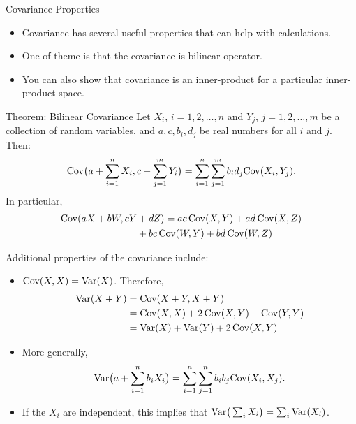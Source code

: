 \begin{frame}[allowframebreaks]{Covariance Properties}
  \begin{itemize}
    \item Covariance has several useful properties that can help with calculations.
    \item One of theme is that the covariance is \alert{bilinear} operator.
    \item You can also show that covariance is an inner-product for a particular inner-product space.
  \end{itemize}
  
  \framebreak
  
  \begin{block}{Theorem: Bilinear Covariance}
    Let $X_i$, $i = 1, 2, \ldots, n$ and $Y_j$, $j = 1, 2, \ldots, m$ be a collection of random variables, and $a, c, b_i, d_j$ be real numbers for all $i$ and $j$. Then:
    $$
    \mathrm{Cov}\big(a + \sum_{i=1}^n X_i, c + \sum_{j = 1}^m Y_i\big) = \sum^n_{i = 1}\sum^m_{j = 1} b_i d_j \mathrm{Cov}(X_i, Y_j).
    $$
    In particular, 
    \begin{align*}
    \mathrm{Cov}(aX + bW, cY &+ dZ) = ac\, \mathrm{Cov}(X, Y) + ad\, \mathrm{Cov}(X, Z) \\ 
    &  + bc\, \mathrm{Cov}(W, Y) + bd\, \mathrm{Cov}(W,Z)
    \end{align*}
  \end{block}
  
  
  \framebreak
  
  Additional properties of the covariance include: 
  
  \begin{itemize}
    \item $\mathrm{Cov}(X, X) = \mathrm{Var}(X)$. Therefore,
    \begin{align*}
      \mathrm{Var}(X + Y) &= \mathrm{Cov}(X+Y, X+Y) \\
      &= \mathrm{Cov}(X, X) + 2\, \mathrm{Cov}(X, Y) + \mathrm{Cov}(Y, Y)\\ 
      &= \mathrm{Var}(X) + \mathrm{Var}(Y) + 2\, \mathrm{Cov}(X, Y)
    \end{align*}
    \item More generally, 
    $$
    \mathrm{Var}\big(a + \sum_{i = 1}^n b_i X_i\big) = \sum_{i = 1}^n \sum_{j = 1}^n b_ib_j \mathrm{Cov}(X_i, X_j). 
    $$
    \item If the $X_i$ are independent, this implies that $\mathrm{Var}\big(\sum_i X_i\big) = \sum_i \mathrm{Var}(X_i)$.
  \end{itemize}
  

\end{frame}
